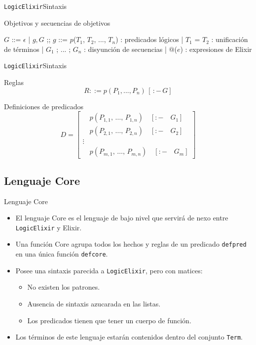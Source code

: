 \documentclass[14pt,aspectratio=169]{beamer}
\begin{document}
\begin{frame}{\texttt{LogicElixir}}{Sintaxis}
  \footnotesize \begin{block}{Objetivos y secuencias de objetivos}
    \begin{bnfgrammar}
      $G$ ::= $\epsilon$ | $g, G$
    ;;
      $g$ ::= $p$($T_1$, $T_2$, ..., $T_n$) : predicados lógicos
          | $T_1$ = $T_2$ : unificación de términos
          | $G_1$ ; ... ; $G_n$ : disyunción de secuencias
          | $@$($e$) : expresiones de Elixir
    \end{bnfgrammar}
  \end{block}
\end{frame}

\begin{frame}{\texttt{LogicElixir}}{Sintaxis}
  \begin{block}{Reglas}
    \begin{equation*}
      R ::= p(P_1, ..., P_n)\,[\,:-\, G]
    \end{equation*}
  \end{block}
  \begin{block}{Definiciones de predicados}
    \begin{equation*}
      D =
      \begin{bmatrix}
        \quad p(P_{1,1},\, \ldots,\, P_{1,n}) \quad [:- \quad G_1]\\
        \quad p(P_{2,1},\, \ldots,\, P_{2,n}) \quad [:- \quad G_2]\\
        \vdots \\
        \quad p(P_{m,1},\, \ldots,\, P_{m,n}) \quad [:- \quad G_m]
      \end{bmatrix}
    \end{equation*}
  \end{block}
\end{frame}

\subsection{Lenguaje Core}
\begin{frame}{Lenguaje Core}
  \begin{itemize}
    \item El lenguaje Core es el lenguaje de bajo nivel que servirá de nexo
    entre \texttt{LogicElixir} y Elixir.
    \item Una función Core agrupa todos los hechos y reglas de un predicado
    \texttt{defpred} en una única función \texttt{defcore}.
    \item Posee una sintaxis parecida a \texttt{LogicElixir}, pero con matices:
    \begin{itemize}
      \item No existen los patrones.
      \item Ausencia de sintaxis azucarada en las listas.
      \item Los predicados tienen que tener un cuerpo de función.
    \end{itemize}
    \item Los términos de este lenguaje estarán contenidos dentro del conjunto
    \texttt{Term}.
  \end{itemize}
\end{frame}
\end{document}
